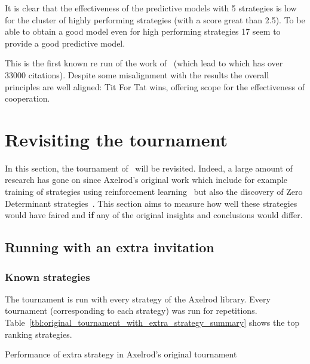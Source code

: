 \documentclass{article}
\begin{document}
It is clear that the effectiveness of the predictive models with 5 strategies is
low for the cluster of highly performing strategies (with a score great than
2.5). To be able to obtain a good model even for high performing strategies 17
seem to provide a good predictive model.

This is the first known re run of the work of~\cite{Axelrod1980b} (which lead to
\cite{Axelrodbook} which has over 33000 citations). Despite some misalignment
with the results the overall principles are well aligned: Tit For Tat wins,
offering scope for the effectiveness of cooperation.

\section{Revisiting the tournament}\label{sec:revisiting}

In this section, the tournament of~\cite{Axelrod1980b} will be revisited.
Indeed, a large amount of research has gone on since Axelrod's original work
which include for example training of strategies using reinforcement
learning~\cite{Harper2017}
but also the discovery of Zero Determinant strategies~\cite{Press2012}. This
section aims to measure how well these strategies would have faired and
\textbf{if} any of the original insights and conclusions would differ.

\subsection{Running with an extra invitation}\label{sec:extra_strategy}

\subsubsection{Known strategies}

The tournament is run with every strategy of the Axelrod library.
Every tournament (corresponding to each strategy) was run
for repetitions.
Table~\ref{tbl:original_tournament_with_extra_strategy_summary} shows the top
ranking strategies.

\begin{table}[!hbtp]
        \tiny
        \centering
        
        \caption{Performance of extra strategy in Axelrod's original tournament}
        \label{tbl:original_tournament_with_extra_strategy_summary}
\end{table}
\end{document}

